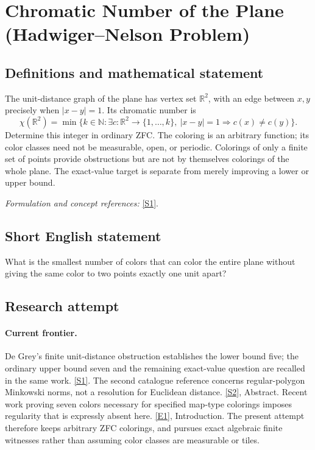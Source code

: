 \documentclass[11pt,a4paper]{article}
\newcommand{\N}{\mathbb{N}}
\newcommand{\R}{\mathbb{R}}
\newcommand{\sref}[2]{\hyperlink{source:#1:#2}{[S#2]}}
\newcommand{\eref}[2]{\hyperlink{extra:#1:#2}{[E#2]}}
\newif\ifshowcatalogue
\newcommand{\cataloguescope}[1]{\ifshowcatalogue
 \paragraph{Exact scope in the supplied catalogue.}
 \begin{quote}\small #1\end{quote}\fi}
\numberwithin{equation}{section}
\begin{document}
\setcounter{section}{219}
\clearpage
\section{\texorpdfstring{Chromatic Number of the Plane (Hadwiger--Nelson Problem)}{Chromatic Number of the Plane (Hadwiger--Nelson Problem)}}\label{220}
\subsection{Definitions and mathematical statement}
The unit-distance graph of the plane has vertex set $\R^2$, with an edge between $x,y$ precisely when $|x-y|=1$. Its chromatic number is
\[
 \chi(\R^2)=\min\{k\in\N:\exists c:\R^2\to\{1,\ldots,k\},
 \ |x-y|=1\Rightarrow c(x)\ne c(y)\}.
\]
Determine this integer in ordinary ZFC. The coloring is an arbitrary function; its color classes need not be measurable, open, or periodic. Colorings of only a finite set of points provide obstructions but are not by themselves colorings of the whole plane. The exact-value target is separate from merely improving a lower or upper bound.
\par\smallskip\textit{Formulation and concept references:} \sref{220}{1}.
\cataloguescope{Determine the chromatic number of the Euclidean plane: the minimum number of colours needed to colour every point so that points at distance exactly one have distinct colours, with ordinary arbitrary colourings in ZFC and no measurability requirement.}
\subsection{Short English statement}
What is the smallest number of colors that can color the entire plane without giving the same color to two points exactly one unit apart?
\subsection{Research attempt}

\paragraph{Current frontier.}
De Grey's finite unit-distance obstruction establishes the lower bound
five; the ordinary upper bound seven and the remaining exact-value
question are recalled in the same work. \sref{220}{1}.
The second catalogue reference concerns regular-polygon Minkowski norms,
not a resolution for Euclidean distance. \sref{220}{2}, Abstract.
Recent work proving seven colors necessary for specified map-type
colorings imposes regularity that is expressly absent here.
\eref{220}{1}, Introduction. The present attempt therefore keeps arbitrary
ZFC colorings, and pursues exact algebraic finite witnesses rather than
assuming color classes are measurable or tiles.
\end{document}
